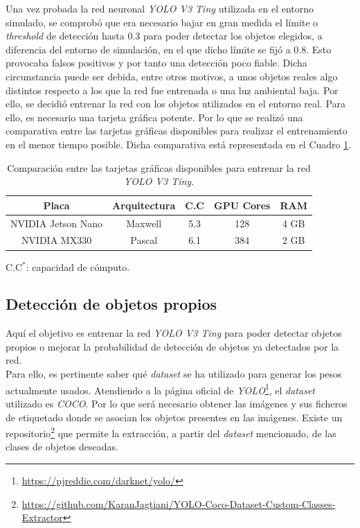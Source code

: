 Una vez probada la red neuronal \textit{YOLO V3 Tiny} utilizada en el entorno simulado, se comprobó que era necesario bajar en gran medida el límite o \textit{threshold} de detección hasta 0.3 para poder detectar los objetos elegidos, a diferencia del entorno de simulación, en el que dicho límite se fijó a 0.8. Esto provocaba falsos positivos y por tanto una detección poco fiable. Dicha circunstancia puede ser debida, entre otros motivos, a unos objetos reales algo distintos respecto a los que la red fue entrenada o una luz ambiental baja. Por ello, se decidió entrenar la red con los objetos utilizados en el entorno real. Para ello, es necesario una tarjeta gráfica potente. Por lo que se realizó una comparativa entre las tarjetas gráficas disponibles para realizar el entrenamiento en el menor tiempo posible. Dicha comparativa está representada en el Cuadro \ref{table:versusnvidia}.\\

\begin{table}[H]
	\begin{center}
		\begin{tabular}{|c|c|c|c|c|}
			\hline
			\textbf{Placa}	& \textbf{Arquitectura} & \textbf{C.C\makebox[0pt][l]{$^*$}} & \textbf{GPU Cores}				& \textbf{RAM}
			\\
			\hline
			NVIDIA Jetson Nano		& Maxwell								& 5.3														& 128												& 4 GB
			\\
			NVIDIA MX330					& Pascal								& 6.1														& 384												& 2 GB
			\\
			\hline
		\end{tabular}
		\parbox[t]{\textwidth}{\footnotesize C.C$^*$: capacidad de cómputo.}
		\caption{Comparación entre las tarjetas gráficas disponibles para entrenar la red \textit{YOLO V3 Tiny}.}
		\label{table:versusnvidia}
	\end{center}
\end{table}

\subsection{Detección de objetos propios}
Aquí el objetivo es entrenar la red \textit{YOLO V3 Tiny} para poder detectar objetos propios o mejorar la probabilidad de detección de objetos ya detectados por la red.\\

Para ello, es pertinente saber qué \textit{dataset} se ha utilizado para generar los pesos actualmente usados. Atendiendo a la página oficial de \textit{YOLO}\footnote{\url{https://pjreddie.com/darknet/yolo/}}, el \textit{dataset} utilizado es \textit{COCO}. Por lo que será necesario obtener las imágenes y sus ficheros de etiquetado donde se asocian los objetos presentes en las imágenes. Existe un repositorio\footnote{\url{https://github.com/KaranJagtiani/YOLO-Coco-Dataset-Custom-Classes-Extractor}} que permite la extracción, a partir del \textit{dataset} mencionado, de las clases de objetos deseadas.\\

